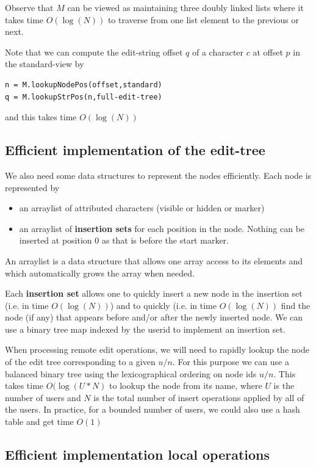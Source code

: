 \documentclass{amsart}
\begin{document}
Observe that $M$ can be viewed as maintaining three doubly linked lists
where it takes time $O(\log(N))$ to traverse from one list element to the
previous or next.

Note that we can compute the edit-string offset $q$ of a character
$c$ at offset $p$ in the standard-view by
\begin{verbatim}
n = M.lookupNodePos(offset,standard)
q = M.lookupStrPos(n,full-edit-tree)
\end{verbatim}
and this takes time $O(\log(N))$

\subsection{Efficient implementation of the edit-tree}

We also need some data structures to represent the nodes efficiently.
Each node is represented by 
\begin{itemize}
\item an arraylist of attributed characters (visible or hidden or marker)
\item an arraylist of {\bf insertion sets} for each position in the node. 
Nothing can be inserted at position 0 as that is before the start marker.
\end{itemize}
An arraylist is a data structure that allows one array access to its elements
and which automatically grows the array when needed.

Each {\bf insertion set} allows one to quickly  insert a new node 
in the insertion set (i.e. in time $O(\log(N))$)
and to quickly (i.e. in time $O(\log(N))$ find the node (if any) that appears before and/or
after the newly inserted node. We can use a binary tree map indexed by
the userid to implement an insertion set.

When processing remote edit operations, we will need to rapidly lookup
the node of the edit tree corresponding to a given $u/n$. For this purpose
we can use a balanced binary tree using the lexicographical ordering on
node ids $u/n$. This takes time $O(\log(U*N)$ to lookup the node from its
name, where $U$ is the number of users and $N$ is the total number of insert operations
applied by all of the users.  
In practice, for a bounded number of users, 
we could also use a hash table and get time $O(1)$

\subsection{Efficient implementation local operations}
\end{document}
